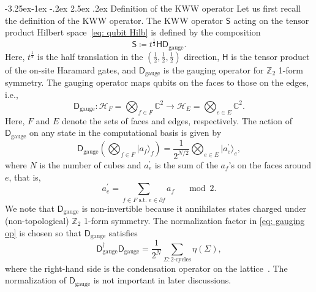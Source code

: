\documentclass[aps,twocolumn,prx,floatfix,preprintnumbers, nofootinbib,10pt]{revtex4-2}
\makeatletter
\numberwithin{equation}{section}
\theoremstyle{definition}
\theoremstyle{remark}
\theoremstyle{claim}
\renewcommand\subsubsection{\@startsection{subsubsection}{3}{\z@}%
                                     {-3.25ex\@plus -1ex \@minus -.2ex}%
                                     {2.5ex \@plus .2ex}%
                                     {\centering\itshape\bfseries\small}}
\def\ket#1{{|{#1}\rangle}}
\makeatother
\begin{document}
\subsubsection{Definition of the KWW operator}
Let us first recall the definition of the KWW operator.
The KWW operator $\mathsf{S}$ acting on the tensor product Hilbert space~\eqref{eq: qubit Hilb} is defined by the composition
\begin{equation}
\mathsf{S} \coloneq t^{\frac{1}{2}} \mathsf{H} \mathsf{D}_{\mathrm{gauge}}.
\label{eq: KWW op}
\end{equation}
Here, $t^{\frac{1}{2}}$ is the half translation in the $(\frac{1}{2}, \frac{1}{2}, \frac{1}{2})$ direction, $\mathsf{H}$ is the tensor product of the on-site Haramard gates, and $\mathsf{D}_{\mathrm{gauge}}$ is the gauging operator for $\mathbb{Z}_2$ 1-form symmetry.
The gauging operator maps qubits on the faces to those on the edges, i.e.,
\begin{equation}
\mathsf{D}_{\mathrm{gauge}}: \mathcal{H}_F = \bigotimes_{f \in F} \mathbb{C}^2 \to \mathcal{H}_E = \bigotimes_{e \in E} \mathbb{C}^2.
\label{eq: gauging op}
\end{equation}
Here, $F$ and $E$ denote the sets of faces and edges, respectively.
The action of $\mathsf{D}_{\mathrm{gauge}}$ on any state in the computational basis is given by \cite{Yoshida:2015cia, Gorantla:2024ocs}
\begin{equation}
\mathsf{D}_{\mathrm{gauge}} \left( \bigotimes_{f \in F} \ket{a_f}_f \right) = \frac{1}{2^{N/2}} \bigotimes_{e \in E} \ket{a^{\prime}_e}_e, 
\end{equation}
where $N$ is the number of cubes and $a^{\prime}_e$ is the sum of the $a_f$'s on the faces around $e$, that is,
\begin{equation}
a^{\prime}_e = \sum_{f \in F \text{ s.t. } e \in \partial f} a_f \quad \mod 2.
\end{equation}
We note that $\mathsf{D}_{\mathrm{gauge}}$ is non-invertible because it annihilates states charged under (non-topological) $\mathbb{Z}_2$ 1-form symmetry.
The normalization factor in \eqref{eq: gauging op} is chosen so that $\mathsf{D}_{\mathrm{gauge}}$ satisfies
\begin{equation}
\mathsf{D}_{\mathrm{gauge}}^{\dagger} \mathsf{D}_{\mathrm{gauge}} = \frac{1}{2^N} \sum_{\Sigma: \text{2-cycles}} \eta(\Sigma),
\end{equation}
where the right-hand side is the condensation operator on the lattice~\cite{Gorantla:2024ocs}.
The normalization of $\mathsf{D}_{\mathrm{gauge}}$ is not important in later discussions.
\end{document}
